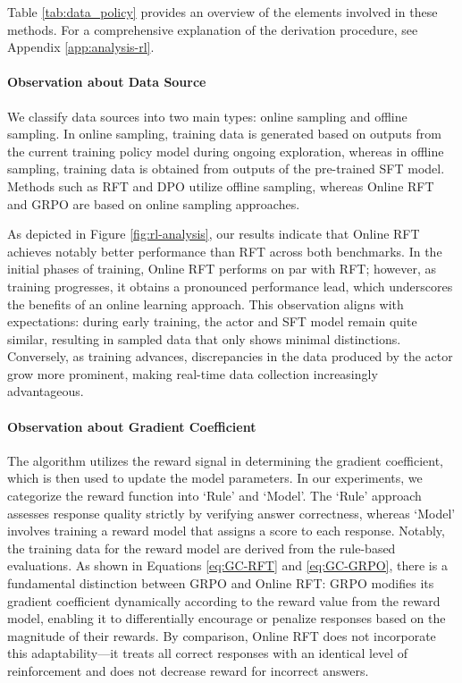 \begin{itemize}[topsep=0pt]
\begin{itemize}[topsep=0pt]
Table \ref{tab:data_policy} provides an overview of the elements involved in these methods. For a comprehensive explanation of the derivation procedure, see Appendix \ref{app:analysis-rl}.

\paragraph{Observation about Data Source} We classify data sources into two main types: online sampling and offline sampling. In online sampling, training data is generated based on outputs from the current training policy model during ongoing exploration, whereas in offline sampling, training data is obtained from outputs of the pre-trained SFT model. Methods such as RFT and DPO utilize offline sampling, whereas Online RFT and GRPO are based on online sampling approaches.

As depicted in Figure \ref{fig:rl-analysis}, our results indicate that Online RFT achieves notably better performance than RFT across both benchmarks. In the initial phases of training, Online RFT performs on par with RFT; however, as training progresses, it obtains a pronounced performance lead, which underscores the benefits of an online learning approach. This observation aligns with expectations: during early training, the actor and SFT model remain quite similar, resulting in sampled data that only shows minimal distinctions. Conversely, as training advances, discrepancies in the data produced by the actor grow more prominent, making real-time data collection increasingly advantageous.

\paragraph{Observation about Gradient Coefficient} The algorithm utilizes the reward signal in determining the gradient coefficient, which is then used to update the model parameters. In our experiments, we categorize the reward function into `Rule' and `Model'. The `Rule' approach assesses response quality strictly by verifying answer correctness, whereas `Model' involves training a reward model that assigns a score to each response. Notably, the training data for the reward model are derived from the rule-based evaluations. As shown in Equations \ref{eq:GC-RFT} and \ref{eq:GC-GRPO}, there is a fundamental distinction between GRPO and Online RFT: GRPO modifies its gradient coefficient dynamically according to the reward value from the reward model, enabling it to differentially encourage or penalize responses based on the magnitude of their rewards. By comparison, Online RFT does not incorporate this adaptability—it treats all correct responses with an identical level of reinforcement and does not decrease reward for incorrect answers.


\end{itemize}
\end{itemize}
